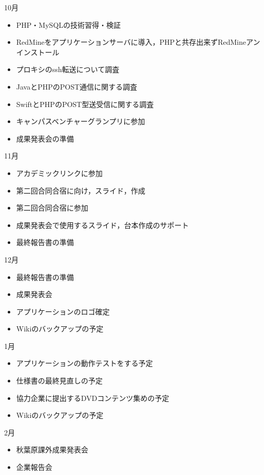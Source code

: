 10月
\begin{itemize}
\item PHP・MySQLの技術習得・検証
\item RedMineをアプリケーションサーバに導入，PHPと共存出来ずRedMineアンインストール
\item プロキシのssh転送について調査
\item JavaとPHPのPOST通信に関する調査
\item SwiftとPHPのPOST型送受信に関する調査
\item キャンパスベンチャーグランプリに参加
\item 成果発表会の準備
\end{itemize}
11月
\begin{itemize}
\item アカデミックリンクに参加
\item 第二回合同合宿に向け，スライド，作成
\item 第二回合同合宿に参加
\item 成果発表会で使用するスライド，台本作成のサポート
\item 最終報告書の準備
\end{itemize}
12月
\begin{itemize}
\item 最終報告書の準備
\item 成果発表会
\item アプリケーションのロゴ確定
\item Wikiのバックアップの予定
\end{itemize}
1月
\begin{itemize}
\item アプリケーションの動作テストをする予定
\item 仕様書の最終見直しの予定
\item 協力企業に提出するDVDコンテンツ集めの予定
\item Wikiのバックアップの予定
\end{itemize}
2月
\begin{itemize}
\item 秋葉原課外成果発表会
\item 企業報告会
\end{itemize}

